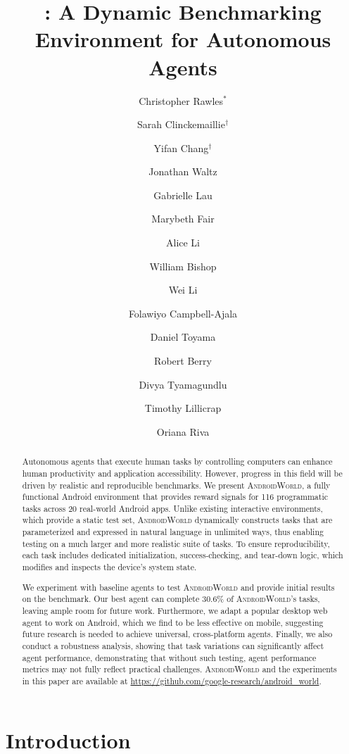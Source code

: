 \documentclass{article}
\title{\system: A Dynamic Benchmarking \\Environment for Autonomous Agents}
\author[1]{Christopher Rawles$^*$}
\author[2]{Sarah Clinckemaillie$^{\dagger}$}
\author[2]{Yifan Chang$^{\dagger}$}
\author[2]{Jonathan Waltz}
\author[2]{Gabrielle Lau}
\author[2]{Marybeth Fair}
\author[1]{Alice Li}
\author[1]{William Bishop}
\author[1]{Wei Li}
\author[1]{Folawiyo Campbell-Ajala}
\author[1]{Daniel Toyama}
\author[1]{Robert Berry}
\author[2]{Divya Tyamagundlu}
\author[1]{Timothy Lillicrap}
\author[1]{Oriana Riva}
\affil[1]{Google DeepMind}
\affil[2]{Google}
\newcommand{\system}{\textsc{AndroidWorld}\xspace}
\newcommand{\ntasks}{116\xspace}
\newcommand{\napps}{20\xspace}
\newcommand{\mthreearesult}{30.6}
\newcommand{\location}{\url{https://github.com/google-research/android_world}}
\begin{document}
\iclrfinalcopy %


\begingroup
\renewcommand{\thefootnote}{\fnsymbol{footnote}}
\endgroup

\maketitle


\begin{abstract}

Autonomous agents that execute human tasks by controlling computers can enhance human productivity and application accessibility. However, progress in this field will be driven by realistic and reproducible benchmarks. We present \system, a fully functional Android environment that provides reward signals for \ntasks programmatic tasks across \napps real-world Android apps. Unlike existing interactive environments, which provide a static test set, \system dynamically constructs tasks that are parameterized and expressed in natural language in unlimited ways, thus enabling testing on a much larger and more realistic suite of tasks. To ensure reproducibility, each task includes dedicated initialization, success-checking, and tear-down logic, which modifies and inspects the device's system state.

We experiment with baseline agents to test \system and provide initial results on the benchmark. Our best agent can complete \mthreearesult\% of \system's tasks, leaving ample room for future work. Furthermore, we adapt a popular desktop web agent to work on Android, which we find to be less effective on mobile, suggesting future research is needed to achieve universal, cross-platform agents. Finally, we also conduct a robustness analysis, showing that task variations can significantly affect agent performance, demonstrating that without such testing, agent performance metrics may not fully reflect practical challenges. \system and the experiments in this paper are available at \location.
\end{abstract}

\section{Introduction}
\label{sec:intro}
\end{document}
